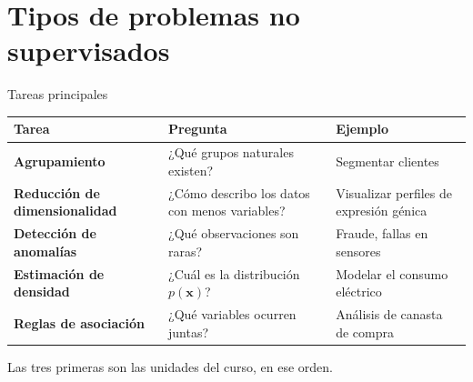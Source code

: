 \documentclass[aspectratio=169,11pt]{beamer}
\newcommand{\x}{\bm{x}}
\begin{document}
\section{Tipos de problemas no supervisados}

\begin{frame}{Tareas principales}
  \renewcommand{\arraystretch}{1.35}
  \begin{tabular}{@{}>{\bfseries}p{}>{\raggedright\arraybackslash}p{}>{\raggedright\arraybackslash}p{}@{}}
    \toprule
    Tarea & Pregunta & Ejemplo \\
    \midrule
    Agrupamiento & ¿Qué grupos naturales existen? & Segmentar clientes \\
    Reducción de dimensionalidad & ¿Cómo describo los datos con menos variables? & Visualizar perfiles de expresión génica \\
    Detección de anomalías & ¿Qué observaciones son raras? & Fraude, fallas en sensores \\
    Estimación de densidad & ¿Cuál es la distribución $p(\x)$? & Modelar el consumo eléctrico \\
    Reglas de asociación & ¿Qué variables ocurren juntas? & Análisis de canasta de compra \\
    \bottomrule
  \end{tabular}
  \vspace{4pt}
  {\small Las tres primeras son las unidades del curso, en ese orden.}
\end{frame}
\end{document}
